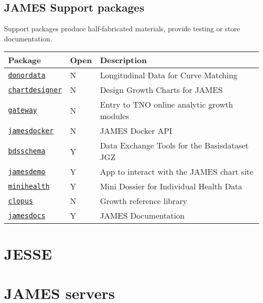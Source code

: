 \documentclass[
]{book}
\begin{document}
\hypertarget{james-support-packages}{%
\subsection{JAMES Support packages}\label{james-support-packages}}

Support packages produce half-fabricated materials, provide testing or store documentation.

\begin{longtable}[]{@{}lll@{}}
\toprule
Package & Open & Description \\
\midrule
\endhead
\href{https://github.com/stefvanbuuren/donordata}{\texttt{donordata}} & N & Longitudinal Data for Curve Matching \\
\href{https://github.com/stefvanbuuren/chartdesigner}{\texttt{chartdesigner}} & N & Design Growth Charts for JAMES \\
\href{https://github.com/stefvanbuuren/gateway}{\texttt{gateway}} & N & Entry to TNO online analytic growth modules \\
\href{https://github.com/growtcharts/jamesdocker}{\texttt{jamesdocker}} & N & JAMES Docker API \\
\href{https://github.com/stefvanbuuren/bdsschema}{\texttt{bdsschema}} & Y & Data Exchange Tools for the Basisdataset JGZ \\
\href{https://github.com/growthcharts/jamesdemo}{\texttt{jamesdemo}} & Y & App to interact with the JAMES chart site \\
\href{https://github.com/stefvanbuuren/minihealth}{\texttt{minihealth}} & Y & Mini Dossier for Individual Health Data \\
\href{https://github.com/stefvanbuuren/clopus}{\texttt{clopus}} & N & Growth reference library \\
\href{https://github.com/stefvanbuuren/jamesdocs}{\texttt{jamesdocs}} & Y & JAMES Documentation \\
\bottomrule
\end{longtable}

\hypertarget{jesse}{%
\section{JESSE}\label{jesse}}

\hypertarget{james-servers}{%
\section{JAMES servers}\label{james-servers}}
\end{document}
